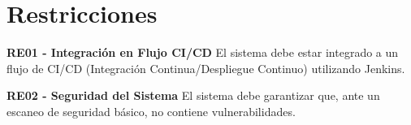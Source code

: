 \section{Restricciones}\label{sec:restricciones}

\textbf{RE01 - Integración en Flujo CI/CD}
El sistema debe estar integrado a un flujo de CI/CD (Integración Continua/Despliegue Continuo) utilizando Jenkins.

\textbf{RE02 - Seguridad del Sistema}
El sistema debe garantizar que, ante un escaneo de seguridad básico, no contiene vulnerabilidades.